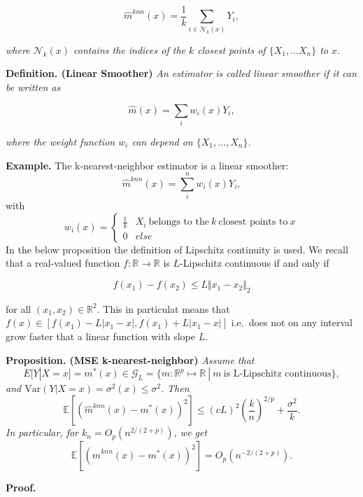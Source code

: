 \documentclass[
]{book}
\begin{document}
\[
\hat m^{knn}(x)= \frac 1 k \sum_{i \in \mathcal N_k(x)}Y_i,
\]

\emph{where \(\mathcal N_k(x)\) contains the indices of the \(k\) closest points of \(\{X_1, \dots X_n\}\) to \(x\).}

\textbf{Definition. (Linear Smoother)} \emph{An estimator is called linear smoother if it can be written as }

\[
\hat m(x)= \sum_i w_i(x)Y_i,
\]

\emph{where the weight function \(w_i\) can depend on \(\{X_1, \dots, X_n\}\).}

\textbf{Example.} The k-nearest-neighbor estimator is a linear smoother:
\[
\hat m^{knn}(x)= \sum_i^n w_i(x) Y_i,
\]
with
\[
w_i(x)=\begin{cases}\frac 1 k & X_i \ \text{belongs to the}\  k \ \text{closest points to}\  x \\ 0 & else\end{cases}
\]
In the below proposition the definition of Lipschitz continuity is used. We recall that a real-valued function \(f:\mathbb R\to\mathbb R\) is \(L\)-Lipschitz continuous if and only if

\[
f(x_1)-f(x_2)\le L\Vert x_1-x_2\Vert_2
\]

for all \((x_1,x_2)\in\mathbb R^2\). This in particulat means that \(f(x)\in[f(x_1)-L\vert x_1-x\vert,f(x_1)+L\vert x_1-x\vert]\) i.e.~does not on any interval grow faster that a linear function with slope \(L\).

\textbf{Proposition. (MSE k-nearest-neighbor)} \emph{Assume that}
\[
E[Y|X=x]=m^\ast(x)\in \mathcal G_L = \{m: \mathbb R^p \mapsto \mathbb R\ |\ m \ \text{is L-Lipschitz continuous}\},
\]
\emph{and \(\textrm{Var}(Y|X=x)=\sigma^2(x)\leq \sigma^2.\) Then }
\[
\mathbb E[(\hat m^{knn}(x)-m^\ast(x))^2]\leq (cL)^2 \left(\frac k n \right)^{2/p}+\frac {\sigma^2}k.
\]
\emph{In particular, for \(k_n=O_p( n^{2/(2+p)})\), we get }
\[
\mathbb E[(\hat m^{knn}(x)-m^\ast(x))^2]=O_p(n^{-2/(2+p)}).
\]

\textbf{Proof.}
\end{document}
